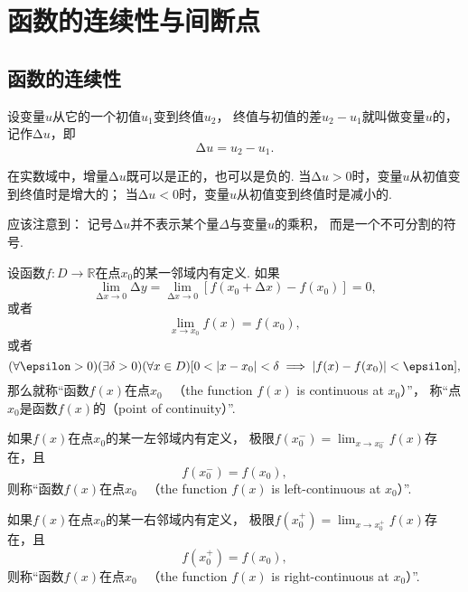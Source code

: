 \section{函数的连续性与间断点}\label{section:极限.函数的连续性与间断点}
\subsection{函数的连续性}
设变量\(u\)从它的一个初值\(u_1\)变到终值\(u_2\)，
终值与初值的差\(u_2 - u_1\)就叫做变量\(u\)的，
记作\(\increment u\)，即\[
	\increment u = u_2 - u_1.
\]

在实数域中，增量\(\increment u\)既可以是正的，也可以是负的.
当\(\increment u > 0\)时，变量\(u\)从初值变到终值时是增大的；
当\(\increment u < 0\)时，变量\(u\)从初值变到终值时是减小的.

应该注意到：
记号\(\increment u\)并不表示某个量\(\Delta\)与变量\(u\)的乘积，
而是一个不可分割的符号.

\begin{definition}\label{definition:极限.函数在一点的连续性}
设函数\(f\colon D\to\mathbb{R}\)在点\(x_0\)的某一邻域内有定义.
如果\[
	\lim_{\increment x\to0} \increment y
	=\lim_{\increment x\to0} [f(x_0 + \increment x)-f(x_0)]
	=0,
\]
或者\[
	\lim_{x \to x_0} f(x) = f(x_0),
\]
或者\[
	(\forall \epsilon > 0)
	(\exists \delta > 0)
	(\forall x \in D)
	[
		0 < \abs{x - x_0} < \delta
		\implies
		\abs{f(x) - f(x_0)} < \epsilon
	],
\]
那么就称“函数\(f(x)\)在点\(x_0\)~
（the function \(f(x)\) is continuous at \(x_0\)）”，
称“点\(x_0\)是函数\(f(x)\)的（point of continuity）”.

如果\(f(x)\)在点\(x_0\)的某一左邻域内有定义，
极限\(f(x_0^-) = \lim_{x \to x_0^-} f(x)\)存在，且\[
	f(x_0^-) = f(x_0),
\]
则称“函数\(f(x)\)在点\(x_0\)~
（the function \(f(x)\) is left-continuous at \(x_0\)）”.

如果\(f(x)\)在点\(x_0\)的某一右邻域内有定义，
极限\(f(x_0^+) = \lim_{x \to x_0^+} f(x)\)存在，且\[
	f(x_0^+) = f(x_0),
\]
则称“函数\(f(x)\)在点\(x_0\)~
（the function \(f(x)\) is right-continuous at \(x_0\)）”.
\end{definition}

\begin{figure}[ht]
	\centering
	\def\fn(#1){ln(#1+3)*4-4}
	\caption{}
\end{figure}

